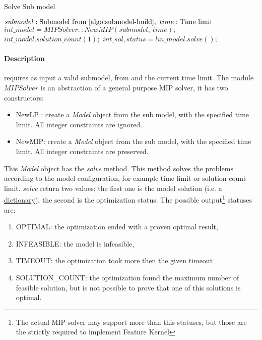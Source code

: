\begin{algorithm}[H]
    \caption{Solve Sub model}\label{algo:solve-submodel}
    \begin{algorithmic}[1]
        \REQUIRE $submodel: \text{Submodel from \Cref{algo:submodel-build}},\ time: \text{Time limit}$
            \STATE $int\_model = MIPSolver::NewMIP(submodel,\ time);$
            \STATE $int\_model.solution\_count(1);$
            \STATE $int\_sol, status = lin\_model.solve();$
            \ELSE 
            \ENDIF
        \ELSE
        \ENDIF
    \end{algorithmic}
\end{algorithm}

\paragraph{Description}  requires as input a valid submodel, from  and the current time limit. The module $MIPSolver$
is an abstraction of a general purpose MIP solver, it has two constructors:
\begin{itemize}
    \item NewLP : create a \emph{Model} object from the sub model, with the specified time limit. All integer constraints are ignored.
    \item NewMIP: create a \emph{Model} object from the sub model, with the specified time limit. All integer constraints are preserved.
\end{itemize}

This \emph{Model} object has the \emph{solve} method. This method solves the problems according to the model configuration, for example time limit or solution count limit. 
\emph{solve} return two values: the first one is the model solution (i.e. a \href{https://en.wikipedia.org/wiki/Associative_array}{dictionary}), 
the second is the optimization
status. The possible output\footnote{The actual MIP solver may support more than this statuses, but those are the strictly required to implement Feature Kernel } statuses are: 
\begin{enumerate}
    \item OPTIMAL: the optimization ended with a proven optimal result,
    \item INFEASIBLE: the model is infeasible,
    \item TIMEOUT: the optimization took more then the given timeout
    \item SOLUTION\_COUNT: the optimization found the maximum number of feasible solution, but is not possible to prove that one of this solutions is optimal.
\end{enumerate}

